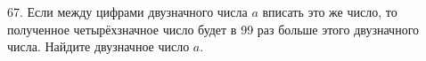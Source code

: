 67. Если между цифрами двузначного числа $a$ вписать это же число, то полученное четырёхзначное число будет в 99 раз больше этого двузначного числа. Найдите двузначное число $a.$\\
